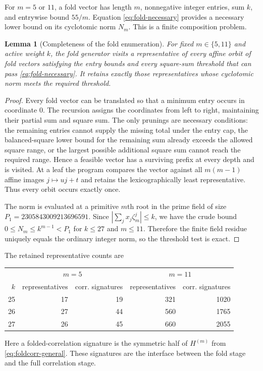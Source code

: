 \documentclass[11pt,a4paper]{article}
\newtheorem{lemma}[theorem]{Lemma}
\theoremstyle{definition}
\theoremstyle{remark}
\newcommand{\Pone}{2305843009213696591}
\begin{document}
For $m=5$ or $11$, a fold vector has length $m$, nonnegative integer entries,
sum $k$, and entrywise bound $55/m$.  Equation \eqref{eq:fold-necessary}
provides a necessary lower bound on its cyclotomic norm $N_m$.  This is a
finite composition problem.

\begin{lemma}[Completeness of the fold enumeration]
\label{lem:fold-complete}
For fixed $m\in\{5,11\}$ and active weight $k$, the fold generator visits a
representative of every affine orbit of fold vectors satisfying the entry
bounds and every square-sum threshold that can pass
\eqref{eq:fold-necessary}.  It retains exactly those representatives whose
cyclotomic norm meets the required threshold.
\end{lemma}

\begin{proof}
Every fold vector can be translated so that a minimum entry occurs in
coordinate $0$.  The recursion assigns the coordinates from left to right,
maintaining their partial sum and square sum.  The only prunings are necessary
conditions: the remaining entries cannot supply the missing total under the
entry cap, the balanced-square lower bound for the remaining sum already
exceeds the allowed square range, or the largest possible additional square
sum cannot reach the required range.  Hence a feasible vector has a surviving
prefix at every depth and is visited.  At a leaf the program compares the
vector against all $m(m-1)$ affine images $j\mapsto uj+t$ and retains the
lexicographically least representative.  Thus every orbit occurs exactly once.

The norm is evaluated at a primitive $m$th root in the prime field of size
$P_1=\Pone$.  Since $|\sum_jx_j\zeta_m^j|\le k$, we have the crude bound
$0\le N_m\le k^{m-1}<P_1$ for $k\le27$ and $m\le11$.  Therefore the finite
field residue uniquely equals the ordinary integer norm, so the threshold test
is exact.
\end{proof}

The retained representative counts are
\begin{center}
\begin{tabular}{@{}r|rr|rr@{}}
\toprule
&\multicolumn{2}{c|}{$m=5$}&\multicolumn{2}{c}{$m=11$}\\
$k$ & representatives & corr. signatures & representatives & corr. signatures\\
\midrule
25&17&19&321&1020\\
26&27&44&560&1765\\
27&26&45&660&2055\\
\bottomrule
\end{tabular}
\end{center}
Here a folded-correlation signature is the symmetric half of
$H^{(m)}$ from \eqref{eq:foldcorr-general}.  These signatures are the interface
between the fold stage and the full correlation stage.
\end{document}
